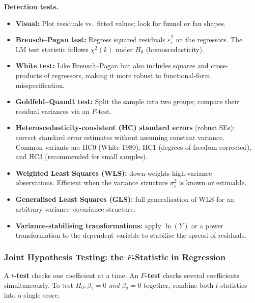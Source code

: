 \textbf{Detection tests.}
\begin{itemize}
    \item \textbf{Visual:} Plot residuals vs.\ fitted values; look for funnel or fan shapes.
    \item \textbf{Breusch--Pagan test:} Regress squared residuals $\hat{\varepsilon}_i^2$ on the regressors. The LM test statistic follows $\chi^2(k)$ under $H_0$ (homoscedasticity).
    \item \textbf{White test:} Like Breusch--Pagan but also includes squares and cross-products of regressors, making it more robust to functional-form misspecification.
    \item \textbf{Goldfeld--Quandt test:} Split the sample into two groups; compare their residual variances via an $F$-test.
\end{itemize}

\begin{remark}[Remedies]
\begin{itemize}
    \item \textbf{Heteroscedasticity-consistent (HC) standard errors} (robust SEs): correct standard error estimates without assuming constant variance. Common variants are HC0 (White 1980), HC1 (degrees-of-freedom corrected), and HC3 (recommended for small samples).
    \item \textbf{Weighted Least Squares (WLS):} down-weights high-variance observations. Efficient when the variance structure $\sigma_i^2$ is known or estimable.
    \item \textbf{Generalised Least Squares (GLS):} full generalisation of WLS for an arbitrary variance--covariance structure.
    \item \textbf{Variance-stabilising transformations:} apply $\ln(Y)$ or a power transformation to the dependent variable to stabilise the spread of residuals.
\end{itemize}
\end{remark}

\subsubsection*{Joint Hypothesis Testing: the $F$-Statistic in Regression}

A \textbf{$t$-test} checks one coefficient at a time. An \textbf{$F$-test} checks several coefficients simultaneously. To test $H_0\colon \beta_1 = 0$ \emph{and} $\beta_2 = 0$ together, combine both $t$-statistics into a single score.

